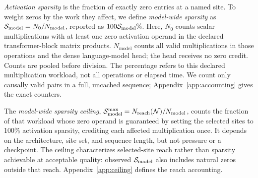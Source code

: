\emph{Activation sparsity} is the fraction of exactly zero entries at a named site.
To weight zeros by the work they affect, we define \emph{model-wide sparsity}
as $\mathcal{S}_{\mathrm{model}}=N_0/N_{\mathrm{model}}$, reported as $100\mathcal{S}_{\mathrm{model}}\%$. Here, $N_0$
counts scalar multiplications with at least one zero activation operand in
the declared transformer-block matrix products. $N_{\mathrm{model}}$ counts all valid multiplications
in those operations and the dense language-model head; the head receives no
zero credit. Counts are pooled before division. The percentage refers to this
declared multiplication workload, not all operations or elapsed time. We count
only causally valid pairs in a full, uncached sequence;
Appendix~\ref{app:accounting} gives the exact counters.

The \emph{model-wide sparsity ceiling},
$\mathcal{S}_{\mathrm{model}}^{\max}=N_{\mathrm{reach}}(\mathcal{N})/N_{\mathrm{model}}$, counts the fraction
of that workload whose zero operand is guaranteed by setting the selected
sites to 100\% activation sparsity, crediting each affected multiplication once. It depends on the architecture,
site set, and sequence length, but not pressure or a checkpoint. The ceiling
characterizes selected-site reach rather than sparsity achievable at acceptable
quality: observed $\mathcal{S}_{\mathrm{model}}$ also includes natural zeros outside that reach.
Appendix~\ref{app:ceiling} defines the reach accounting.
